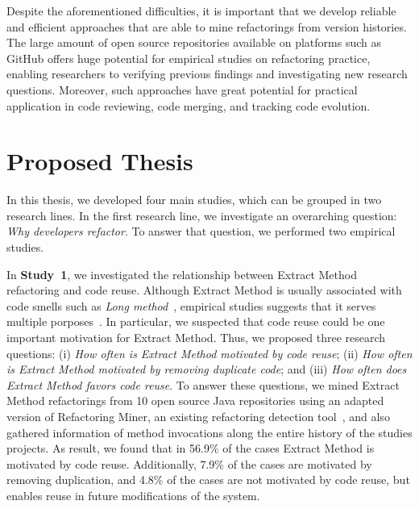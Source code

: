 Despite the aforementioned difficulties, it is important that we develop reliable and efficient approaches that are able to mine refactorings from version histories.
The large amount of open source repositories available on platforms such as GitHub offers huge potential for empirical studies on refactoring practice, enabling researchers to verifying previous findings and investigating new research questions.
Moreover, such approaches have great potential for practical application in code reviewing, code merging, and tracking code evolution.



\section{Proposed Thesis}
\label{ProposedThesis}

In this thesis, we developed four main studies, which can be grouped in two research lines.
In the first research line, we investigate an overarching question: \emph{Why developers refactor}.
To answer that question, we performed two empirical studies.

In \textbf{Study~1}, we investigated the relationship between Extract Method refactoring and code reuse.
Although Extract Method is usually associated with code smells such as \emph{Long method}~\citep{Fowler:1999}, empirical studies suggests that it serves multiple porposes~\citep{tsantalis_empiricalstudy}.
In particular, we suspected that code reuse could be one important motivation for Extract Method. Thus, we proposed three research questions: (i) \emph{How often is Extract Method motivated by code reuse}; (ii) \emph{How often is Extract Method motivated by removing duplicate code}; and (iii) \emph{How often does Extract Method favors code reuse}.
To answer these questions, we mined Extract Method refactorings from 10 open source Java repositories using an adapted version of Refactoring Miner, an existing refactoring detection tool~\citep{tsantalis_empiricalstudy}, and also gathered information of method invocations along the entire history of the studies projects.
As result, we found that in 56.9\% of the cases Extract Method is motivated by code reuse. Additionally, 7.9\% of the cases are motivated by removing duplication, and 4.8\% of the cases are not motivated by code reuse, but enables reuse in future modifications of the system.

